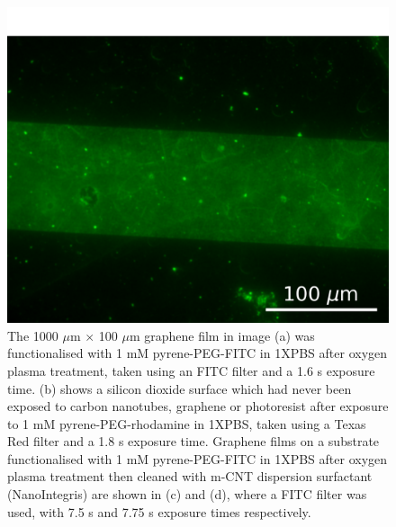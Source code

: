 \documentclass[
  a4paper,
]{scrbook}
\begin{document}
\begin{figure}
\begin{minipage}[t]{0.47\linewidth}
{{\includegraphics{figures/ch7/modified_NGW6D7_PyPEGFITC_channel1_postmsurfclean_7.75sexposure_40X_221123.png}

}

}

\subcaption{\label{fig-PPF-PBS-40X}}
\end{minipage}%

\caption{\label{fig-silicon-dioxide-interaction}The 1000 \(\mu\)m
\(\times\) 100 \(\mu\)m graphene film in image (a) was functionalised
with 1 mM pyrene-PEG-FITC in 1XPBS after oxygen plasma treatment, taken
using an FITC filter and a 1.6 s exposure time. (b) shows a silicon
dioxide surface which had never been exposed to carbon nanotubes,
graphene or photoresist after exposure to 1 mM pyrene-PEG-rhodamine in
1XPBS, taken using a Texas Red filter and a 1.8 s exposure time.
Graphene films on a substrate functionalised with 1 mM pyrene-PEG-FITC
in 1XPBS after oxygen plasma treatment then cleaned with m-CNT
dispersion surfactant (NanoIntegris) are shown in (c) and (d), where a
FITC filter was used, with 7.5 s and 7.75 s exposure times
respectively.}

\end{figure}
\end{document}
